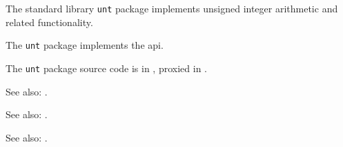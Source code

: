 
The standard library {\tt unt} package implements unsigned integer arithmetic and related 
functionality.

The {\tt unt} package implements the  api.

The {\tt unt} package source code is in , 
proxied in .

See also: .

See also: .

See also: .

